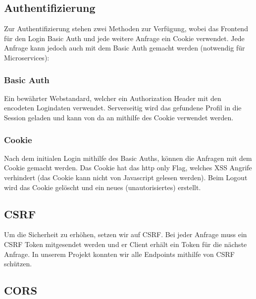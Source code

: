 \documentclass[11pt]{article} %
\begin{document}
\subsection{Authentifizierung}
Zur Authentifizierung stehen zwei Methoden zur Verfügung, wobei das Frontend für den Login Basic Auth und jede weitere Anfrage ein Cookie verwendet. Jede Anfrage kann jedoch auch mit dem Basic Auth gemacht werden (notwendig für Microservices):

\subsubsection{Basic Auth}
Ein bewährter Webstandard, welcher ein Authorization Header mit den encodeten Logindaten verwendet. Serverseitig wird das gefundene Profil in die Session geladen und kann von da an mithilfe des Cookie verwendet werden.

\subsubsection{Cookie}
Nach dem initialen Login mithilfe des Basic Auths, können die Anfragen mit dem Cookie gemacht werden. Das Cookie hat das http only Flag, welches XSS Angrife verhindert (das Cookie kann nicht von Javascript gelesen werden). Beim Logout wird das Cookie gelöscht und ein neues (unautorisiertes) erstellt.

\subsection{CSRF}
Um die Sicherheit zu erhöhen, setzen wir auf CSRF. Bei jeder Anfrage muss ein CSRF Token mitgesendet werden und er Client erhält ein Token für die nächste Anfrage. In unserem Projekt konnten wir alle Endpoints mithilfe von CSRF schützen.

\subsection{CORS}


\newpage
\end{document}

